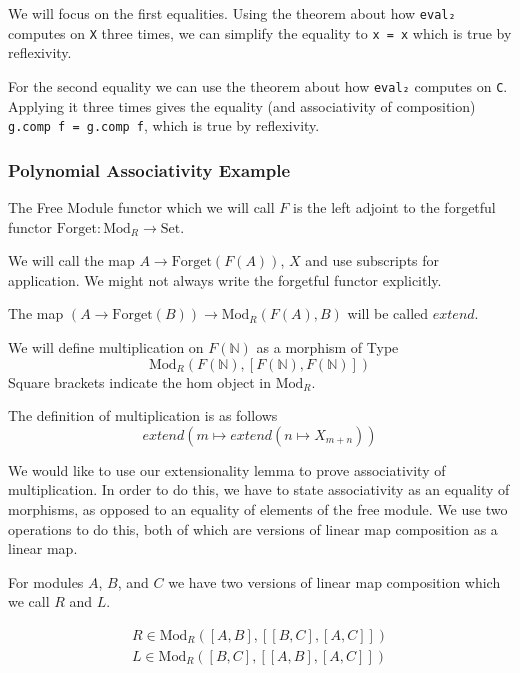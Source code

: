 \documentclass[12pt]{article} %
\theoremstyle{definition}
\theoremstyle{definition}
\theoremstyle{definition}
\theoremstyle{definition}
\begin{document}
We will focus on the first equalities. Using the theorem about how \lstinline{eval₂}
computes on \lstinline{X} three times, we can simplify the equality to \lstinline{x = x} which is true
by reflexivity.

For the second equality we can use the theorem about how \lstinline{eval₂}
computes on \lstinline{C}. Applying it three times gives the equality
(and associativity of composition) \lstinline{g.comp f = g.comp f}, which is true by reflexivity.

\subsubsection{Polynomial Associativity Example}


The Free Module functor which we will call $F$ is the left adjoint to the forgetful
functor $\text{Forget} : \text{Mod}_R \to \text{Set}$.

We will call the map $A \to \text{Forget}(F(A))$, $X$ and use subscripts for application.
We might not always write the forgetful functor explicitly.

The map $(A \to \text{Forget}(B)) \to {\text{Mod}_R}(F(A), B)$ will be called $extend$.

We will define multiplication on $F(\mathbb{N})$ as a morphism of Type
\begin{equation}
  \text{Mod}_R(F(\mathbb{N}), [F(\mathbb{N}), F(\mathbb{N})])
\end{equation}
Square brackets indicate the hom object in $\text{Mod}_R$.

The definition of multiplication is as follows
\begin{equation}
  extend (m \mapsto extend (n \mapsto X_{m + n}))
\end{equation}

We would like to use our extensionality lemma to prove associativity of multiplication.
In order to do this, we have to state associativity as an equality of morphisms,
as opposed to an equality of elements of the free module. We use two operations
to do this, both of which are versions of linear map composition as a linear map.

For modules $A$, $B$, and $C$ we have two versions of linear map
composition which we call $R$ and $L$.

\begin{equation}
  \begin{aligned}
    R \in \text{Mod}_R([A, B], [[B,C],[A,C]]) \\
     L \in \text{Mod}_R([B, C], [[A,B],[A,C]])
  \end{aligned}
\end{equation}
\end{document}
